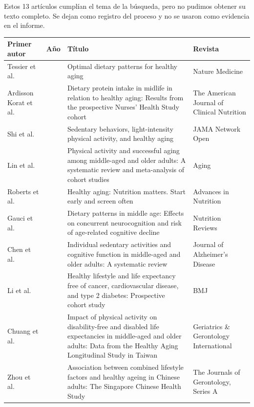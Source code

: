 \documentclass[12pt, letterpaper, table, xcdraw]{extarticle}
\renewcommand{\arraystretch}{2}
\begin{document}
Estos 13 artículos cumplían el tema de la búsqueda, pero no pudimos obtener su texto completo. Se dejan como registro del proceso y no se usaron como evidencia en el informe.

{\footnotesize
\renewcommand{\arraystretch}{1.3}
\begin{longtable}{|>{\raggedright\arraybackslash}p{2.4cm}|>{\centering\arraybackslash}p{0.9cm}|>{\raggedright\arraybackslash}p{7.2cm}|>{\raggedright\arraybackslash}p{3.3cm}|}
    \hline
    \textbf{Primer autor} & \textbf{Año} & \textbf{Título} & \textbf{Revista} \\ \hline
    \endhead
    Tessier et al. & 2025 & Optimal dietary patterns for healthy aging & Nature Medicine \\ \hline
    Ardisson Korat et al. & 2024 & Dietary protein intake in midlife in relation to healthy aging: Results from the prospective Nurses' Health Study cohort & The American Journal of Clinical Nutrition \\ \hline
    Shi et al. & 2024 & Sedentary behaviors, light-intensity physical activity, and healthy aging & JAMA Network Open \\ \hline
    Lin et al. & 2020 & Physical activity and successful aging among middle-aged and older adults: A systematic review and meta-analysis of cohort studies & Aging \\ \hline
    Roberts et al. & 2021 & Healthy aging: Nutrition matters. Start early and screen often & Advances in Nutrition \\ \hline
    Gauci et al. & 2022 & Dietary patterns in middle age: Effects on concurrent neurocognition and risk of age-related cognitive decline & Nutrition Reviews \\ \hline
    Chen et al. & 2026 & Individual sedentary activities and cognitive function in middle-aged and older adults: A systematic review & Journal of Alzheimer's Disease \\ \hline
    Li et al. & 2020 & Healthy lifestyle and life expectancy free of cancer, cardiovascular disease, and type 2 diabetes: Prospective cohort study & BMJ \\ \hline
    Chuang et al. & 2024 & Impact of physical activity on disability-free and disabled life expectancies in middle-aged and older adults: Data from the Healthy Aging Longitudinal Study in Taiwan & Geriatrics \& Gerontology International \\ \hline
    Zhou et al. & 2021 & Association between combined lifestyle factors and healthy ageing in Chinese adults: The Singapore Chinese Health Study & The Journals of Gerontology, Series A \\ \hline

\end{longtable}}
\end{document}
